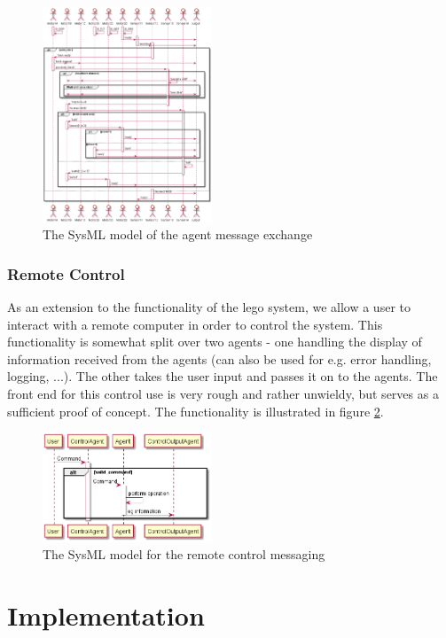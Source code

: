 \documentclass[conference]{IEEEtran}
\begin{document}
\begin{figure}[htbp]
\centerline{\includegraphics[width=0.45\textwidth]{sysml/communications.png}}
\caption{The SysML\cite{sysml} model of the agent message exchange}
\label{comms}
\end{figure}

\subsubsection{Remote Control}

As an extension to the functionality of the lego system, we allow a user to interact with a remote computer in order to control the system. This functionality is somewhat split over two agents - one handling the display of information received from the agents (can also be used for e.g. error handling, logging, ...). The other takes the user input and passes it on to the agents. The front end for this control use is very rough and rather unwieldy, but serves as a sufficient proof of concept. The functionality is illustrated in figure \ref{control}. 

\begin{figure}[htbp]
\centerline{\includegraphics[width=0.45\textwidth]{sysml/control.png}}
\caption{The SysML\cite{sysml} model for the remote control messaging}
\label{control}
\end{figure}

\section{Implementation}
\end{document}
